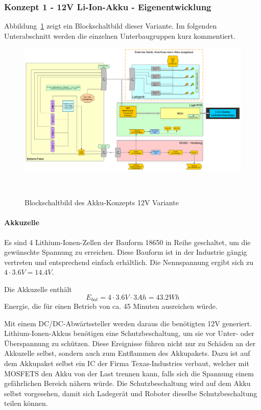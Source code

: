 \documentclass[main.tex]{subfiles} %
\begin{document}
\subsubsection*{Konzept 1 - 12V Li-Ion-Akku - Eigenentwicklung}

Abbildung~\ref{fig:Konzept_12V_Eigenentw} zeigt ein Blockschaltbild dieser
Variante. Im folgenden Unterabschnitt werden die einzelnen Unterbaugruppen kurz
kommentiert.

\begin{figure}[h!]
    \centering
    \includegraphics[width=1\textwidth]{./fig_Boardnetz/SpeisungsKonzept_LiIon_12V.pdf}
    \caption{Blockschaltbild des Akku-Konzepts 12V Variante}~\label{fig:Konzept_12V_Eigenentw}
\end{figure}

\paragraph{Akkuzelle}
Es sind 4 Lithium-Ionen-Zellen der Bauform 18650 in Reihe geschaltet, um die
gewünschte Spannung zu erreichen. Diese Bauform ist in der Industrie gängig
vertreten und entsprechend einfach erhältlich. Die Nennspannung ergibt sich zu
$4 \cdot 3.6V = 14.4V$.

Die Akkuzelle enthält
\[
    E_{bat} = 4 \cdot 3.6V \cdot 3Ah = 43.2Wh
\]
Energie, die für einen Betrieb von ca. 45 Minuten ausreichen würde.

Mit einem DC/DC-Abwärtssteller werden daraus die benötigten 12V generiert.
Lithium-Ionen-Akkus benötigen eine Schutzbeschaltung, um sie vor Unter- oder
Überspannung zu schützen. Diese Ereignisse führen nicht nur zu Schäden an der
Akkuzelle selbst, sondern auch zum Entflammen des Akkupakets. Dazu ist auf dem
Akkupaket selbst ein IC der Firma Texas-Industries verbaut, welcher mit MOSFETS
den Akku von der Last trennen kann, falls sich die Spannung einem gefährlichen
Bereich nähern würde. Die Schutzbeschaltung wird auf dem Akku selbst
vorgesehen, damit sich Ladegerät und Roboter dieselbe Schutzbeschaltung teilen
können.
\end{document}
